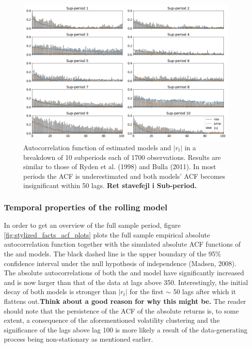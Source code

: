 \begin{figure}[H] 
    \centering
    \includegraphics[width=1.0\textwidth]{analysis/stylized_facts/images/acf_abs_subperiods.png}
    \caption[Autocorrelation function of estimated models and $|r_t|$ on subsamples]{Autocorrelation function of estimated models and $|r_t|$ in a breakdown of 10 subperiods each of 1700 observations. Results are similar to those of Ryden et al. (1998) and Bulla (2011). In most periods the ACF is underestimated and both models' ACF becomes insignificant within 50 lags. \textbf{Ret stavefejl i Sub-period.}}
    \label{fig:stylized_facts_acf_plots_sub_periods} 
\end{figure}

\subsubsection{Temporal properties of the rolling model}

In order to get an overview of the full sample period, figure \ref{fig:stylized_facts_acf_plots} plots the full sample empirical absolute autocorrelation function together with the simulated absolute ACF functions of the \mle and \jump models. The black dashed line is the upper boundary of the 95\% confidence interval under the null hypothesis of independence (Madsen, 2008). The absolute autocorrelations of both the \mle and \jump model have significantly increased and is now larger than that of the data at lags above 350. Interestingly, the initial decay of both models is stronger than $|r_t|$ for the first $\sim$ 50 lags after which it flattens out.\textbf{Think about a good reason for why this might be.}
The reader should note that the persistence of the ACF of the absolute returns is, to some extent, a consequence of the aforementioned volatility clustering and the significance of the lags above lag 100 is more likely a result of the data-generating process being non-stationary as mentioned earlier. 

